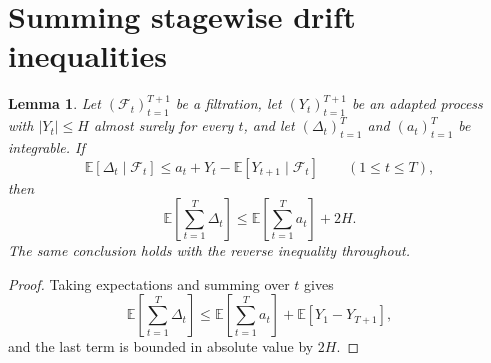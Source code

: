 \documentclass[12pt]{article}
\newtheorem{lemma}[theorem]{Lemma}
\theoremstyle{definition}
\newcommand{\E}{\mathbb{E}}
\newcommand{\1}{\mathbf{1}}
\newcommand{\cF}{\mathcal{F}}
\begin{document}
\section{Summing stagewise drift inequalities}
\label{app:aggregation}

\begin{lemma}
\label{lem:aggregation}
Let $(\cF_t)_{t=1}^{T+1}$ be a filtration, let $(Y_t)_{t=1}^{T+1}$ be an adapted
process with $|Y_t|\le H$ almost surely for every $t$, and let
$(\Delta_t)_{t=1}^T$ and $(a_t)_{t=1}^T$ be integrable. If
\[
\E[\Delta_t\mid \cF_t]
\le
a_t + Y_t - \E[Y_{t+1}\mid \cF_t]
\qquad (1\le t\le T),
\]
then
\[
\E\left[\sum_{t=1}^T \Delta_t\right]
\le
\E\left[\sum_{t=1}^T a_t\right] + 2H.
\]
The same conclusion holds with the reverse inequality throughout.
\end{lemma}

\begin{proof}
Taking expectations and summing over $t$ gives
\[
\E\left[\sum_{t=1}^T \Delta_t\right]
\le
\E\left[\sum_{t=1}^T a_t\right]
+
\E[Y_1-Y_{T+1}],
\]
and the last term is bounded in absolute value by $2H$.
\end{proof}
\end{document}
